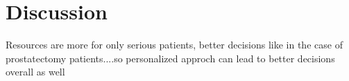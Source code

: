 \section{Discussion}
Resources are more for only serious patients, better decisions like in the case of prostatectomy patients....so personalized approch can lead to better decisions overall as well